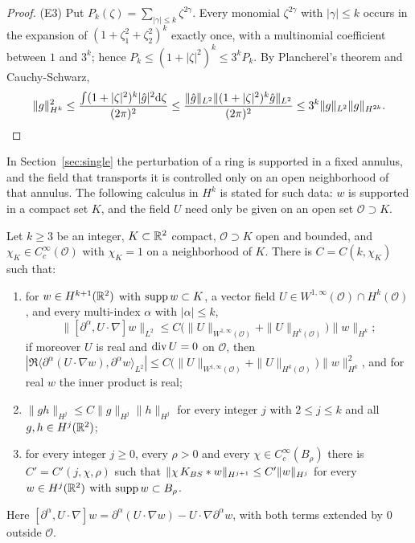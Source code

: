 \begin{proof}
(E3) Put $P_k(\zeta)=\sum_{|\gamma|\le k}\zeta^{2\gamma}$. Every monomial
$\zeta^{2\gamma}$ with $|\gamma|\le k$ occurs in the expansion of
$(1+\zeta_1^2+\zeta_2^2)^k$ exactly once, with a multinomial coefficient between
$1$ and $3^k$; hence $P_k\le(1+|\zeta|^2)^k\le3^kP_k$. By Plancherel's theorem and
Cauchy-Schwarz,
\[
\|g\|_{H^k}^2\le\frac{\int(1+|\zeta|^2)^k|\hat g|^2\dd\zeta}{(2\pi)^2}
\le\frac{\|\hat g\|_{L^2}\|(1+|\zeta|^2)^{k}\hat g\|_{L^2}}{(2\pi)^2}
\le3^k\|g\|_{L^2}\|g\|_{H^{2k}} .\qedhere
\]
\end{proof}

In Section~\ref{sec:single} the perturbation of a ring is supported in a fixed
annulus, and the field that transports it is controlled only on an open
neighborhood of that annulus. The following calculus in $H^k$ is stated for
such data: $w$ is supported in a compact set $K$, and the field $U$ need only be
given on an open set $\mathcal O\supset K$.

\begin{lemma}
\label{lem:Hk-calculus}
Let $k\ge3$ be an integer, $K\subset\mathbb{R}^2$ compact, $\mathcal O\supset K$ open and
bounded, and $\chi_K\in C_c^\infty(\mathcal O)$ with $\chi_K=1$ on a neighborhood of
$K$. There is $C=C(k,\chi_K)$ such that:
\begin{enumerate}[label=\textup{(\arabic*)}]
\item for $w\in H^{k+1}(\mathbb{R}^2)$ with $\operatorname{supp} w\subset K$, a vector field
  $U\in W^{1,\infty}(\mathcal O)\cap H^k(\mathcal O)$, and every multi-index $\alpha$ with
  $|\alpha|\le k$,
  \[
  \|[\partial^\alpha,U\cdot\nabla]w\|_{L^2}\le C\big(\|U\|_{W^{1,\infty}(\mathcal O)}+\|U\|_{H^k(\mathcal O)}\big)\|w\|_{H^k};
  \]
  if moreover $U$ is real and $\operatorname{div} U=0$ on $\mathcal O$, then
  $|\Re\langle\partial^\alpha(U\cdot\nabla w),\partial^\alpha w\rangle_{L^2}|\le
  C\big(\|U\|_{W^{1,\infty}(\mathcal O)}+\|U\|_{H^k(\mathcal O)}\big)\|w\|_{H^k}^2$, and for
  real $w$ the inner product is real;
\item $\|gh\|_{H^j}\le C\|g\|_{H^j}\|h\|_{H^j}$ for every integer $j$ with
  $2\le j\le k$ and all $g,h\in H^j(\mathbb{R}^2)$;
\item for every integer $j\ge0$, every $\rho>0$ and every $\chi\in C_c^\infty(B_\rho)$
  there is $C'=C'(j,\chi,\rho)$ such that
  $\|\chi\,K_{BS}\ast w\|_{H^{j+1}}\le C'\|w\|_{H^j}$ for every $w\in H^j(\mathbb{R}^2)$ with
  $\operatorname{supp} w\subset B_\rho$.
\end{enumerate}
Here $[\partial^\alpha,U\cdot\nabla]w=\partial^\alpha(U\cdot\nabla w)-U\cdot\nabla\partial^\alpha w$,
with both terms extended by $0$ outside $\mathcal O$.
\end{lemma}

